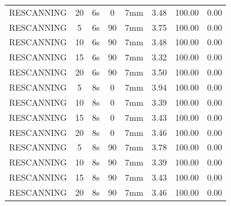 \documentclass[type=dr, dr=rernat, accentcolor=tud7b,colorbacktitle, bigchapter, openright, twoside, 12pt ]{tudthesis}
\begin{document}
\begin{table}[H]
\begin{tabular}{|c|c||c|c|c||c|c|c|}
RESCANNING & 20 & 6s & 0 & 7mm & 3.48 & 100.00 & 0.00 \\
RESCANNING & 5 & 6s & 90 & 7mm & 3.75 & 100.00 & 0.00 \\
RESCANNING & 10 & 6s & 90 & 7mm & 3.48 & 100.00 & 0.00 \\
RESCANNING & 15 & 6s & 90 & 7mm & 3.32 & 100.00 & 0.00 \\
RESCANNING & 20 & 6s & 90 & 7mm & 3.50 & 100.00 & 0.00 \\
RESCANNING & 5 & 8s & 0 & 7mm & 3.94 & 100.00 & 0.00 \\
RESCANNING & 10 & 8s & 0 & 7mm & 3.39 & 100.00 & 0.00 \\
RESCANNING & 15 & 8s & 0 & 7mm & 3.43 & 100.00 & 0.00 \\
RESCANNING & 20 & 8s & 0 & 7mm & 3.46 & 100.00 & 0.00 \\
RESCANNING & 5 & 8s & 90 & 7mm & 3.78 & 100.00 & 0.00 \\
RESCANNING & 10 & 8s & 90 & 7mm & 3.39 & 100.00 & 0.00 \\
RESCANNING & 15 & 8s & 90 & 7mm & 3.43 & 100.00 & 0.00 \\
RESCANNING & 20 & 8s & 90 & 7mm & 3.46 & 100.00 & 0.00 \\
    \hline\hline 
  \end{tabular}
\end{table}
\end{document}
